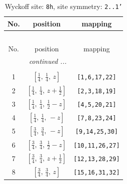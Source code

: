 \documentclass[fleqn,8pt]{jsarticle}
\begin{document}
\begin{longtable}{ccc}
\caption{Wyckoff site: {\tt 8h}, site symmetry: {\tt 2..1'}}
 \\
 \hline \hline
No. & position & mapping \\ \hline \endfirsthead

\multicolumn{2}{l}{\tablename\ \thetable{}} \\
 \hline \hline
No. & position & mapping \\ \hline \endhead

 \hline \hline
\multicolumn{2}{r}{\footnotesize\it continued ...} \\ \endfoot

 \hline \hline
\multicolumn{2}{r}{} \\ \endlastfoot

1 & $\left[ \frac{1}{4},\, \frac{1}{4},\, z \right]$ & {\tt [1,6,17,22]} \\ \hline
2 & $\left[ \frac{1}{4},\, \frac{1}{4},\, z + \frac{1}{2} \right]$ & {\tt [2,3,18,19]} \\ \hline
3 & $\left[ \frac{1}{4},\, \frac{1}{4},\, \frac{1}{2} - z \right]$ & {\tt [4,5,20,21]} \\ \hline
4 & $\left[ \frac{1}{4},\, \frac{1}{4},\, - z \right]$ & {\tt [7,8,23,24]} \\ \hline
5 & $\left[ \frac{3}{4},\, \frac{3}{4},\, - z \right]$ & {\tt [9,14,25,30]} \\ \hline
6 & $\left[ \frac{3}{4},\, \frac{3}{4},\, \frac{1}{2} - z \right]$ & {\tt [10,11,26,27]} \\ \hline
7 & $\left[ \frac{3}{4},\, \frac{3}{4},\, z + \frac{1}{2} \right]$ & {\tt [12,13,28,29]} \\ \hline
8 & $\left[ \frac{3}{4},\, \frac{3}{4},\, z \right]$ & {\tt [15,16,31,32]} \\
\end{longtable}
\renewcommand{\arraystretch}{1.2}
\end{document}
